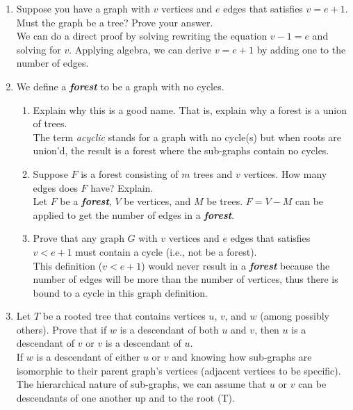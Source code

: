 \documentclass[11pt,a4paper]{article}
\newcommand\setItemNumber[1]{\setcounter{enumi}{\numexpr#1-1\relax}}
\begin{document}
\begin{enumerate}
        \item Suppose you have a graph with $v$ vertices and $e$ edges that satisfies $v=e+1$. Must the graph be a tree? Prove your answer.\\
            We can do a direct proof by solving rewriting the equation $v - 1 = e$ and solving for $v$. Applying algebra, we can derive $v = e + 1$ by adding one to the number of edges.

        \setItemNumber{7}
        \item We define a \textbf{\emph{forest}} to be a graph with no cycles.
            \begin{enumerate}
                \item Explain why this is a good name. That is, explain why a forest is a union of trees.\\
                    The term \textit{acyclic} stands for a graph with no cycle(s) but when roots are union'd, the result is a forest where the sub-graphs contain no cycles.
                \item Suppose $F$ is a forest consisting of $m$ trees and $v$ vertices. How many edges does $F$ have? Explain.\\
                    Let $F$ be a \textbf{\emph{forest}}, $V$ be vertices, and $M$ be trees. $F = V - M$ can be applied to get the number of edges in a \textbf{\emph{forest}}.
                \item Prove that any graph $G$ with $v$ vertices and $e$ edges that satisfies $v<e+1$ must contain a cycle (i.e., not be a forest).\\
                    This definition ($v < e + 1$) would never result in a \textbf{\emph{forest}} because the number of edges will be more than the number of vertices, thus there is bound to a cycle in this graph definition.\\
            \end{enumerate}

        \setItemNumber{11}
        \item Let $T$ be a rooted tree that contains vertices $u$, $v$, and $w$ (among possibly others). Prove that if $w$ is a descendant of both $u$ and $v$, then $u$ is a descendant of $v$ or $v$ is a descendant of $u$.\\
                    If $w$ is a descendant of either $u$ or $v$ and knowing how sub-graphs are isomorphic to their parent graph's vertices (adjacent vertices to be specific). The hierarchical nature of sub-graphs, we can assume that $u$ or $v$ can be descendants of one another up and to the root (T).


\end{enumerate}
\end{document}
